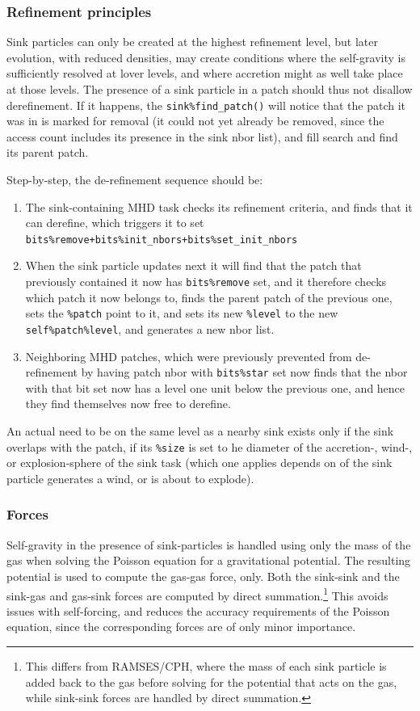 \documentclass[paper=a4,fontsize=11pt]{scrartcl}
\numberwithin{equation}{section}		%
\numberwithin{figure}{section}			%
\numberwithin{table}{section}				%
\begin{document}
\subsubsection{Refinement principles}
Sink particles can only be created at the highest refinement level, but later evolution, with reduced densities, may create conditions where the self-gravity is sufficiently resolved at lover levels, and where accretion might as well take place at those levels.  The presence of a sink particle in a patch should thus not disallow derefinement.  If it happens, the \verb|sink%find_patch()| will notice that the patch it was in is marked for removal (it could not yet already be removed, since the access count includes its presence in the sink nbor list), and fill search and find its parent patch.

Step-by-step, the de-refinement sequence should be:
\begin{enumerate}
    \item The sink-containing MHD task checks its refinement criteria, and finds that it can derefine, which triggers it to set \verb|bits%remove+bits%init_nbors+bits%set_init_nbors|
    \item When the sink particle updates next it will find that the patch that previously contained it now has \verb|bits%remove| set, and it therefore checks which patch it now belongs to, finds the parent patch of the previous one, sets the \verb|%patch| point to it, and sets its new \verb|%level| to the new \verb|self%patch%level|, and generates a new nbor list.
    \item Neighboring MHD patches, which were previously prevented from de-refinement by having patch nbor with \verb|bits%star| set now finds that the nbor with that bit set now has a level one unit below the previous one, and hence they find themselves now free to derefine.
\end{enumerate}
An actual need to be on the same level as a nearby sink exists only if the sink overlaps with the patch, if its \verb|%size| is set to he diameter of the accretion-, wind-, or explosion-sphere of the sink task (which one applies depends on of the sink particle generates a wind, or is about to explode).

\subsubsection{Forces}
Self-gravity in the presence of sink-particles is handled using only the mass of the gas when solving the Poisson equation for a gravitational potential.  The resulting potential is used to compute the gas-gas force, only.  Both the sink-sink and the sink-gas and gas-sink forces are computed by direct summation.\footnote{This differs from RAMSES/CPH, where the mass of each sink particle is added back to the gas before solving for the potential that acts on the gas, while sink-sink forces are handled by direct summation.}  This avoids issues with self-forcing, and reduces the accuracy requirements of the Poisson equation, since the corresponding forces are of only minor importance.
\end{document}
